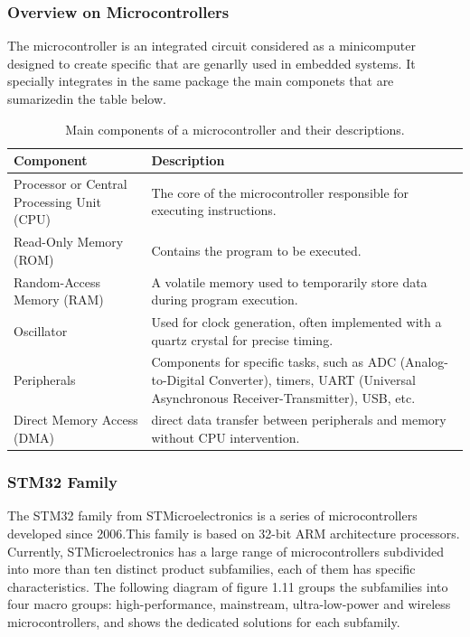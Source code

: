 \subsubsection{Overview on Microcontrollers}
The microcontroller is an integrated circuit considered as a minicomputer designed to create specific  that are genarlly used in embedded systems. It specially integrates in the same package the main componets that are sumarizedin the table below.
\begin{table}[h!]
\centering
\caption{Main components of a microcontroller and their descriptions.}
\begin{tabular}{|l|p{7cm}|}
\hline
\textbf{Component} & \textbf{Description} \\ \hline
Processor or Central Processing Unit (CPU) & The core of the microcontroller responsible for executing instructions. \\ \hline
Read-Only Memory (ROM) & Contains the program to be executed. \\ \hline
Random-Access Memory (RAM) & A volatile memory used to temporarily store data during program execution. \\ \hline
Oscillator & Used for clock generation, often implemented with a quartz crystal for precise timing. \\ \hline
Peripherals & Components for specific tasks, such as ADC (Analog-to-Digital Converter), timers, UART (Universal Asynchronous Receiver-Transmitter), USB, etc. \\ \hline
Direct Memory Access (DMA) &  direct data transfer between peripherals and memory without CPU intervention. \\ \hline
\end{tabular}
\label{tab:microcontroller_components}
\end{table}

\subsubsection{STM32 Family}
The STM32 family from STMicroelectronics is a series of microcontrollers developed since 2006\cite{stm32microcontrollers}.This family is based on 32-bit ARM architecture processors.
Currently, STMicroelectronics has a large range of microcontrollers subdivided into more than ten distinct product subfamilies, each of them has specific characteristics. The following diagram of figure 1.11 groups the subfamilies into four macro groups: high-performance, mainstream, ultra-low-power and wireless microcontrollers, and shows the dedicated solutions for each subfamily.

